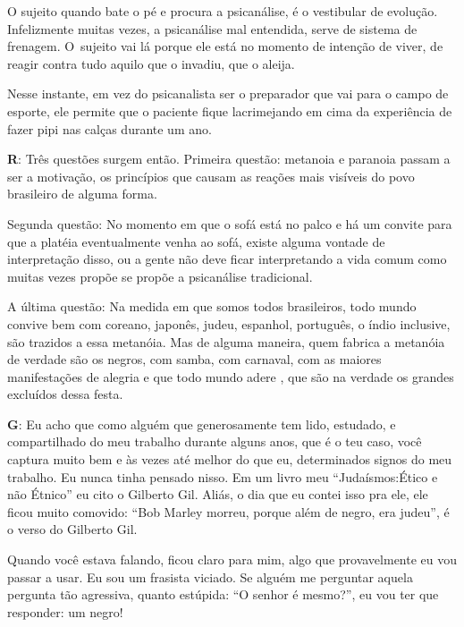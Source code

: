  

O sujeito quando bate o pé e procura a psicanálise, é o vestibular de
evolução. Infelizmente muitas vezes, a psicanálise mal entendida, serve
de sistema de frenagem. O~sujeito vai lá porque ele está no momento de
intenção de viver, de reagir contra tudo aquilo que o invadiu, que o
aleija.

 

Nesse instante, em vez do psicanalista ser o preparador que vai para o
campo de esporte, ele permite que o paciente fique lacrimejando em cima
da experiência de fazer pipi nas calças durante um ano.

 

\textbf{R}: Três questões surgem então. Primeira questão: metanoia e
paranoia passam a ser a motivação, os princípios que causam as reações
mais visíveis do povo brasileiro de alguma forma.

Segunda questão: No momento em que o sofá está no palco e há um convite
para que a platéia eventualmente venha ao sofá, existe alguma vontade de
interpretação disso, ou a gente não deve ficar interpretando a vida
comum como muitas vezes propõe se propõe a psicanálise tradicional.

A última questão: Na medida em que somos todos brasileiros, todo mundo
convive bem com coreano, japonês, judeu, espanhol, português, o índio
inclusive, são trazidos a essa metanóia. Mas de alguma maneira, quem
fabrica a metanóia de verdade são os negros, com samba, com carnaval,
com as maiores manifestações de alegria e que todo mundo adere , que são
na verdade os grandes excluídos dessa festa.

 

\textbf{G}: Eu acho que como alguém que generosamente tem lido,
estudado, e compartilhado do meu trabalho durante alguns anos, que é o
teu caso, você captura muito bem e às vezes até melhor do que eu,
determinados signos do meu trabalho. Eu nunca tinha pensado nisso. Em um
livro meu ``Judaísmos:Ético e não Étnico'' eu cito o Gilberto Gil.
Aliás, o dia que eu contei isso pra ele, ele ficou muito comovido: ``Bob
Marley morreu, porque além de negro, era judeu'', é o verso do Gilberto
Gil.

 

Quando você estava falando, ficou claro para mim, algo que provavelmente
eu vou passar a usar. Eu sou um frasista viciado. Se alguém me perguntar
aquela pergunta tão agressiva, quanto estúpida: ``O senhor é mesmo?'',
eu vou ter que responder: um negro!

